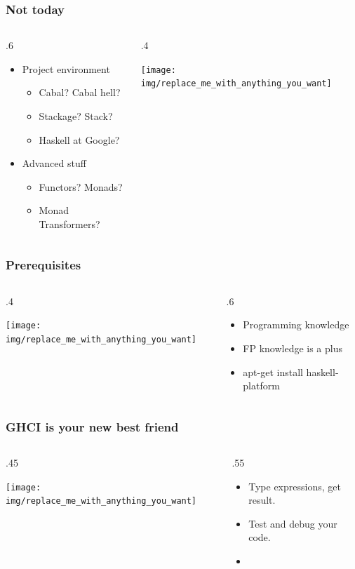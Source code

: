 \documentclass[17pt]{beamer}
\renewcommand{\(}[1]{\begin{columns}[#1]}
\renewcommand{\)}{\end{columns}}
\newcommand{\<}[1]{\begin{column}{#1}}
\renewcommand{\>}{\end{column}}
\begin{document}
\begin{frame}
  \frametitle{Not today}
  \({c}
  \<{.6\textwidth}
  \begin{center}
  \begin{itemize}
  \item Project environment
    \begin{itemize}
    \item Cabal? Cabal hell?
    \item Stackage? Stack?
    \item Haskell at Google?
    \end{itemize}
  \end{itemize}
  \begin{itemize}
  \item Advanced stuff
    \begin{itemize}
    \item Functors? Monads?
    \item Monad Transformers?
    \end{itemize}
  \end{itemize}
  \end{center}
  \>
  \<{.4\textwidth}
  \begin{center}
    \texttt{[image: img/replace\_me\_with\_anything\_you\_want]}
  \end{center}
  \>
  \)
\end{frame}

\begin{frame}
  \frametitle{Prerequisites}
  \({c}
  \<{.4\textwidth}
  \begin{center}
    \texttt{[image: img/replace\_me\_with\_anything\_you\_want]}
  \end{center}
  \>
  \<{.6\textwidth}
  \begin{center}
  \begin{itemize}
    \item Programming knowledge
    \item FP knowledge is a plus
    \item apt-get install haskell-platform
  \end{itemize}
  \end{center}
  \>
  \)
\end{frame}

\begin{frame}
  \frametitle{GHCI is your new best friend}
  \({c}
  \<{.45\textwidth}
  \begin{center}
    \texttt{[image: img/replace\_me\_with\_anything\_you\_want]}
  \end{center}
  \>
  \<{.55\textwidth}
  \begin{center}
  \begin{itemize}
    \item Type expressions, get result.
    \item Test and debug your code.
    \item {}
  \end{itemize}
  \end{center}
  \>
  \)
\end{frame}
\end{document}
